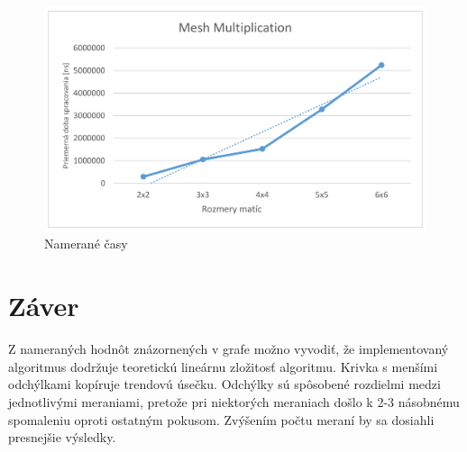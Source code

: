 \documentclass[a4paper,11pt]{article}
\begin{document}
\begin{figure}[!htb]
\centering
\includegraphics[width=\textwidth]{stats.pdf}
\caption{Namerané časy}
\label{stats}
\end{figure}

\makeatletter
\setlength{\@fptop}{0pt}
\makeatother

\section{Záver}
Z nameraných hodnôt znázornených v grafe možno vyvodiť, že implementovaný algoritmus dodržuje teoretickú lineárnu zložitosť algoritmu. Krivka s menšími odchýlkami kopíruje trendovú úsečku. Odchýlky sú spôsobené rozdielmi medzi jednotlivými meraniami, pretože pri niektorých meraniach došlo k 2-3 násobnému spomaleniu oproti ostatným pokusom. Zvýšením počtu meraní by sa dosiahli presnejšie výsledky.
\end{document}
